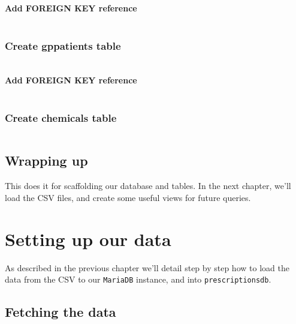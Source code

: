 \documentclass[english,a4paper,]{report}
\begin{document}
\inputminted[firstline=21,lastline=34]{sql}{src/sql/00-setup.sql}

\subsubsection{Add FOREIGN KEY
reference}\label{add-foreign-key-reference}

\inputminted[firstline=36,lastline=36]{sql}{src/sql/00-setup.sql}

\subsection{Create gppatients table}\label{create-gppatients-table}

\inputminted[firstline=43,lastline=46]{sql}{src/sql/00-setup.sql}

\subsubsection{Add FOREIGN KEY
reference}\label{add-foreign-key-reference-1}

\inputminted[firstline=48,lastline=48]{sql}{src/sql/00-setup.sql}

\subsection{Create chemicals table}\label{create-chemicals-table}

\inputminted[firstline=38,lastline=41]{sql}{src/sql/00-setup.sql}

\section{Wrapping up}\label{wrapping-up}

This does it for scaffolding our database and tables. In the next
chapter, we'll load the CSV files, and create some useful views for
future queries.

\chapter{Setting up our data}\label{setting-up-our-data}

As described in the previous chapter we'll detail step by step how to
load the data from the CSV to our \texttt{MariaDB} instance, and into
\texttt{prescriptionsdb}.

\section{Fetching the data}\label{fetching-the-data}
\end{document}
